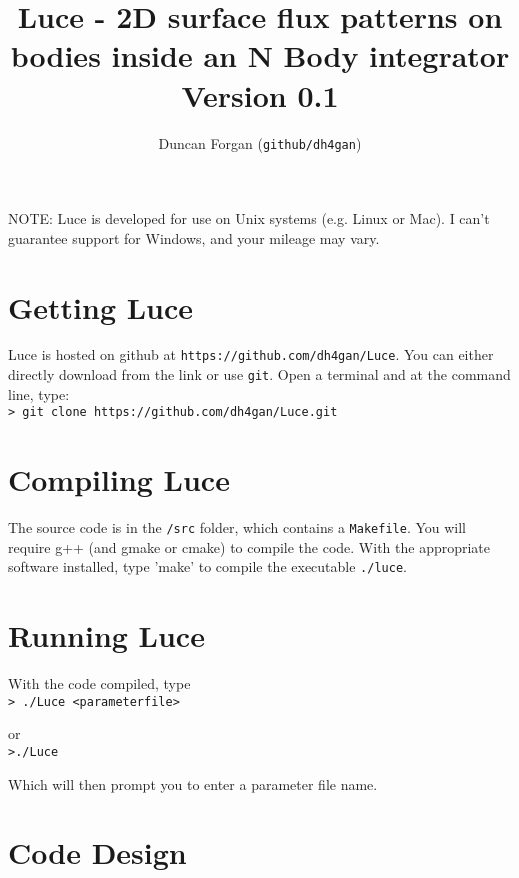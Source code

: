\documentclass[usenatbib,11pt]{article}
\begin{document}
\title{Luce - 2D surface flux patterns on bodies inside an N Body integrator\\Version 0.1}
\author{Duncan Forgan (\texttt{github/dh4gan})}
\maketitle

\noindent NOTE: Luce is developed for use on Unix systems (e.g. Linux or Mac).  I can't guarantee support for Windows, and your mileage may vary.

\tableofcontents
\newpage



\section{Getting Luce}

\noindent Luce is hosted on github at \texttt{https://github.com/dh4gan/Luce}.  You can either directly download from the link or use \texttt{git}.  Open a terminal and at the command line, type:\\

\texttt{> git clone https://github.com/dh4gan/Luce.git}

\section{Compiling Luce}

\noindent   The source code is in the \texttt{/src} folder, which contains a \texttt{Makefile}.  You will require g++ (and gmake or cmake) to compile the code. With the appropriate software installed, type 'make' to compile the executable \texttt{./luce}.


\section{Running Luce}

\noindent With the code compiled, type\\

\texttt{> ./Luce <parameterfile>}

\noindent or\\

\texttt{>./Luce}

Which will then prompt you to enter a parameter file name.

\section{Code Design}
\end{document}
